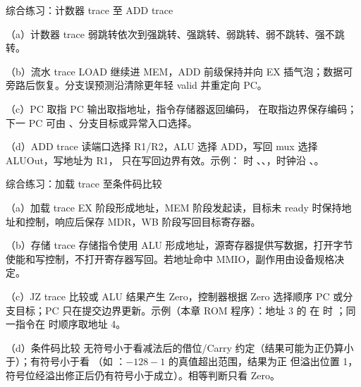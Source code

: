 \begin{chapteranswer}{综合练习：计数器 trace 至 ADD trace}
\begin{answersubproblem}{（a）计数器 trace}
弱跳转依次到强跳转、强跳转、弱跳转、弱不跳转、强不跳转。
\end{answersubproblem}
\begin{answersubproblem}{（b）流水 trace}
LOAD 继续进 MEM，ADD 前级保持并向 EX 插气泡；数据可旁路后恢复。分支误预测沿清除更年轻 valid 并重定向 PC。
\end{answersubproblem}
\begin{answersubproblem}{（c）PC 取指}
PC 输出取指地址，指令存储器返回编码， 在取指边界保存编码；下一 PC 可由 、分支目标或异常入口选择。
\end{answersubproblem}
\begin{answersubproblem}{（d）ADD trace}
读端口选择 R1/R2，ALU 选择 ADD，写回 mux 选择 ALUOut，写地址为 R1， 只在写回边界有效。示例： 时 、、，时钟沿 、。
\end{answersubproblem}
\end{chapteranswer}

\begin{chapteranswer}{综合练习：加载 trace 至条件码比较}
\begin{answersubproblem}{（a）加载 trace}
EX 阶段形成地址，MEM 阶段发起读，目标未 ready 时保持地址和控制，响应后保存 MDR，WB 阶段写回目标寄存器。
\end{answersubproblem}
\begin{answersubproblem}{（b）存储 trace}
存储指令使用 ALU 形成地址，源寄存器提供写数据，打开字节使能和写控制，不打开寄存器写回。若地址命中 MMIO，副作用由设备规格决定。
\end{answersubproblem}
\begin{answersubproblem}{（c）JZ trace}
比较或 ALU 结果产生 Zero，控制器根据 Zero 选择顺序 PC 或分支目标；PC 只在提交边界更新。示例（本章 ROM 程序）：地址 3 的  在  时 ；同一指令在  时顺序取地址 4。
\end{answersubproblem}
\begin{answersubproblem}{（d）条件码比较}
无符号小于看减法后的借位/Carry 约定（结果可能为正仍算小于）；有符号小于看 （如 ：$-128-1$ 的真值超出范围，结果为正  但溢出位置 1，符号位经溢出修正后仍有符号小于成立）。相等判断只看 Zero。
\end{answersubproblem}
\end{chapteranswer}

